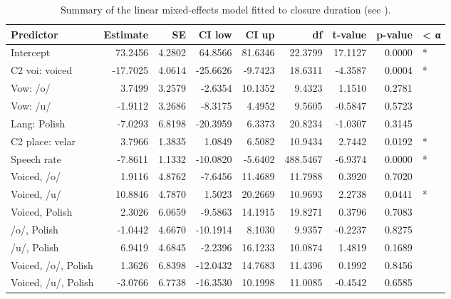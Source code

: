 \documentclass[12pt,]{article}
\begin{document}
\begin{table}

\caption{\label{tab:clo-table}Summary of the linear mixed-effects model fitted to closure duration (see ).}
\centering
\begin{tabular}[t]{lrrrrrrrl}
\toprule
Predictor & Estimate & SE & CI low & CI up & df & t-value & p-value & < α\\
\midrule
Intercept & 73.2456 & 4.2802 & 64.8566 & 81.6346 & 22.3799 & 17.1127 & 0.0000 & *\\
C2 voi: voiced & -17.7025 & 4.0614 & -25.6626 & -9.7423 & 18.6311 & -4.3587 & 0.0004 & *\\
Vow: /o/ & 3.7499 & 3.2579 & -2.6354 & 10.1352 & 9.4323 & 1.1510 & 0.2781 & \\
Vow: /u/ & -1.9112 & 3.2686 & -8.3175 & 4.4952 & 9.5605 & -0.5847 & 0.5723 & \\
Lang: Polish & -7.0293 & 6.8198 & -20.3959 & 6.3373 & 20.8234 & -1.0307 & 0.3145 & \\
\addlinespace
C2 place: velar & 3.7966 & 1.3835 & 1.0849 & 6.5082 & 10.9434 & 2.7442 & 0.0192 & *\\
Speech rate & -7.8611 & 1.1332 & -10.0820 & -5.6402 & 488.5467 & -6.9374 & 0.0000 & *\\
Voiced, /o/ & 1.9116 & 4.8762 & -7.6456 & 11.4689 & 11.7988 & 0.3920 & 0.7020 & \\
Voiced, /u/ & 10.8846 & 4.7870 & 1.5023 & 20.2669 & 10.9693 & 2.2738 & 0.0441 & *\\
Voiced, Polish & 2.3026 & 6.0659 & -9.5863 & 14.1915 & 19.8271 & 0.3796 & 0.7083 & \\
\addlinespace
/o/, Polish & -1.0442 & 4.6670 & -10.1914 & 8.1030 & 9.9357 & -0.2237 & 0.8275 & \\
/u/, Polish & 6.9419 & 4.6845 & -2.2396 & 16.1233 & 10.0874 & 1.4819 & 0.1689 & \\
Voiced, /o/, Polish & 1.3626 & 6.8398 & -12.0432 & 14.7683 & 11.4396 & 0.1992 & 0.8456 & \\
Voiced, /u/, Polish & -3.0766 & 6.7738 & -16.3530 & 10.1998 & 11.0085 & -0.4542 & 0.6585 & \\
\bottomrule
\end{tabular}
\end{table}
\end{document}
